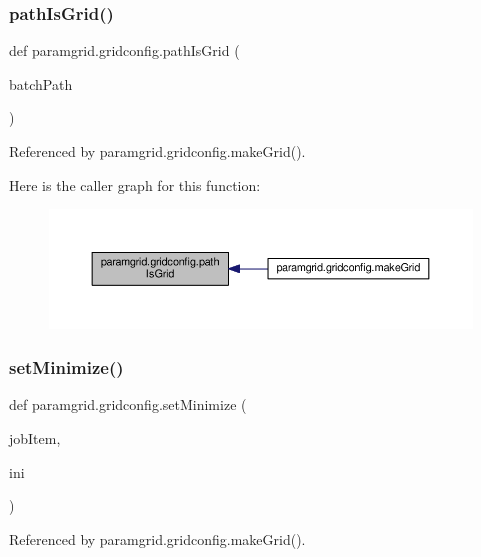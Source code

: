 \subsubsection{\texorpdfstring{path\+Is\+Grid()}{pathIsGrid()}}
{\footnotesize\ttfamily def paramgrid.\+gridconfig.\+path\+Is\+Grid (\begin{DoxyParamCaption}\item[{}]{batch\+Path }\end{DoxyParamCaption})}



Referenced by paramgrid.\+gridconfig.\+make\+Grid().

Here is the caller graph for this function\+:
\nopagebreak
\begin{figure}[H]
\begin{center}
\leavevmode
\includegraphics[width=350pt]{namespaceparamgrid_1_1gridconfig_a8b090aa6e31b89e92894db3c174a7c94_icgraph}
\end{center}
\end{figure}
\mbox{\label{namespaceparamgrid_1_1gridconfig_a914c9c48fd66faa640b61db278b94e2a}} 
\subsubsection{\texorpdfstring{set\+Minimize()}{setMinimize()}}
{\footnotesize\ttfamily def paramgrid.\+gridconfig.\+set\+Minimize (\begin{DoxyParamCaption}\item[{}]{job\+Item,  }\item[{}]{ini }\end{DoxyParamCaption})}



Referenced by paramgrid.\+gridconfig.\+make\+Grid().

